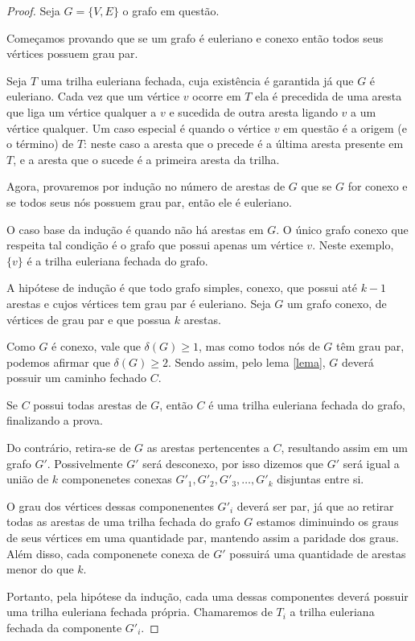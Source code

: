 \documentclass{article}
\begin{document}
\begin{proof}

Seja $G = \{V, E\}$ o grafo em questão.

Começamos provando que se um grafo é euleriano e conexo então todos seus vértices possuem grau par.

Seja $T$ uma trilha euleriana fechada, cuja existência é garantida já que $G$ é euleriano. Cada vez que um vértice $v$ ocorre em $T$ ela é precedida de uma aresta que liga um vértice qualquer a $v$ e sucedida de outra aresta ligando $v$ a um vértice qualquer. 
Um caso especial é quando o vértice $v$ em questão é a origem (e o término) de $T$: neste caso a aresta que o precede é a última aresta presente em $T$, e a aresta que o sucede é a primeira aresta da trilha.


Agora, provaremos por indução no número de arestas de $G$ que se $G$ for conexo e se todos seus nós possuem grau par, então ele é euleriano.

O caso base da indução é quando não há arestas em $G$. 
O único grafo conexo que respeita tal condição é o grafo que possui apenas um vértice $v$.
Neste exemplo, $\{v\}$ é a trilha euleriana fechada do grafo.

A hipótese de indução é que todo grafo simples, conexo, que possui até $k-1$ arestas e cujos vértices tem grau par é euleriano. 
Seja $G$ um grafo conexo, de vértices de grau par e que possua $k$ arestas.

Como $G$ é conexo, vale que $\delta(G) \geq 1$, mas como todos nós de $G$ têm grau par, podemos afirmar que $\delta(G) \geq 2$. 
Sendo assim, pelo lema \ref{lema}, $G$ deverá possuir um caminho fechado $C$.

Se $C$ possui todas arestas de $G$, então $C$ é uma trilha euleriana fechada do grafo, finalizando a prova.

Do contrário, retira-se de $G$ as arestas pertencentes a $C$, resultando assim em um grafo $G'$. 
Possivelmente $G'$ será desconexo, por isso dizemos que $G'$ será igual a união de $k$ componenetes conexas $G'_1, G'_2, G'_3, \dots, G'_k$ disjuntas entre si.

O grau dos vértices dessas componenentes $G'_i$ deverá ser par, já que ao retirar todas as arestas de uma trilha fechada do grafo $G$ estamos diminuindo os graus de seus vértices em uma quantidade par, mantendo assim a paridade dos graus. Além disso, cada componenete conexa de $G'$ possuirá uma quantidade de arestas menor do que $k$.

Portanto, pela hipótese da indução, cada uma dessas componentes deverá possuir uma trilha euleriana fechada própria. 
Chamaremos de $T_i$ a trilha euleriana fechada da componente $G'_i$.


\end{proof}
\end{document}
